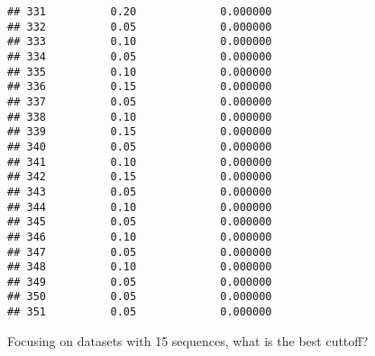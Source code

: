 \documentclass[
]{article}
\newenvironment{Shaded}{\begin{snugshade}}{\end{snugshade}}
\newcommand{\DataTypeTok}[1]{\textcolor[rgb]{0.13,0.29,0.53}{#1}}
\newcommand{\DecValTok}[1]{\textcolor[rgb]{0.00,0.00,0.81}{#1}}
\newcommand{\KeywordTok}[1]{\textcolor[rgb]{0.13,0.29,0.53}{\textbf{#1}}}
\newcommand{\NormalTok}[1]{#1}
\newcommand{\OperatorTok}[1]{\textcolor[rgb]{0.81,0.36,0.00}{\textbf{#1}}}
\newcommand{\StringTok}[1]{\textcolor[rgb]{0.31,0.60,0.02}{#1}}
\begin{document}
\begin{verbatim}
## 331          0.20             0.000000
## 332          0.05             0.000000
## 333          0.10             0.000000
## 334          0.05             0.000000
## 335          0.10             0.000000
## 336          0.15             0.000000
## 337          0.05             0.000000
## 338          0.10             0.000000
## 339          0.15             0.000000
## 340          0.05             0.000000
## 341          0.10             0.000000
## 342          0.15             0.000000
## 343          0.05             0.000000
## 344          0.10             0.000000
## 345          0.05             0.000000
## 346          0.10             0.000000
## 347          0.05             0.000000
## 348          0.10             0.000000
## 349          0.05             0.000000
## 350          0.05             0.000000
## 351          0.05             0.000000
\end{verbatim}

Focusing on datasets with 15 sequences, what is the best cuttoff?

\begin{Shaded}
\end{Shaded}
\end{document}
